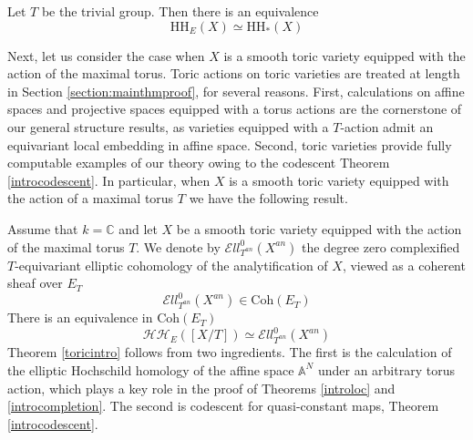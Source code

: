 \documentclass[11pt,letterpaper]{amsart}
\newenvironment{customthm}[1]
{\renewcommand\theinnercustomthm{#1}\innercustomthm}
  {\endinnercustomthm}
\newcommand{\cF}{\mathcal{F}}
\newcommand{\Qcoh}{\mathrm{Qcoh}}
\begin{document}
\begin{customthm}{C}
[Corollary \ref{corollary:LoopstackequalsMapo}]
\label{introtrivialaction}
Let $T$ be the trivial group. Then there is an equivalence 
$$
\mathrm{HH}_E(X) \simeq \mathrm{HH}_*(X)
$$
\end{customthm}


Next, let us consider the case  when $X$ is a smooth toric variety equipped with the action of the maximal torus. Toric actions on toric varieties are treated at length in Section \ref{section:mainthmproof}, for several reasons. First, calculations on affine spaces and projective spaces equipped with a torus actions are the cornerstone of our general structure results, as varieties equipped with a $T$-action admit  an equivariant local embedding in affine space. Second, toric varieties provide fully computable examples of our theory owing to the codescent Theorem \ref{introcodescent}. In particular, when $X$ is a smooth toric variety equipped with the action of a maximal torus $T$ we have the following result.    

Assume that $k=\mathbb{C}$ and let $X$ be a smooth toric variety equipped with the action of the maximal torus $T$. We denote by $\mathcal{E} ll^0_{T^{an}}(X^{an})$ the degree zero complexified $T$-equivariant elliptic cohomology of the analytification of $X$, viewed as a coherent sheaf over $E_T$  
$$
\mathcal{E} ll^0_{T^{an}}(X^{an}) \in \mathrm{Coh}(E_T)
$$
\begin{customthm}{D}
[Theorem \ref{theorem:ellipticohoftoricvar}]
\label{toricintro}
There is an equivalence in $\mathrm{Coh}(E_T)$
$$
 \mathcal{HH}_E([X/T])  \simeq \mathcal{E} ll^0_{T^{an}}(X^{an})
$$
\end{customthm}
Theorem \ref{toricintro} follows from two ingredients. The first is the calculation of the elliptic Hochschild homology of the affine space $\mathbb{A}^N$ under an arbitrary torus action, which  plays a key role in the proof of  Theorems \ref{introloc} and \ref{introcompletion}. The second is   codescent  for quasi-constant maps, Theorem \ref{introcodescent}. 
\end{document}
